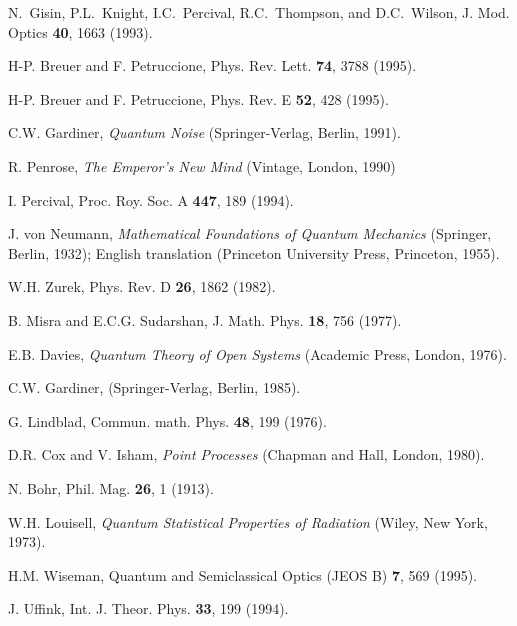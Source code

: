 \begin{thebibliography}{99}
N.~Gisin, P.L.~Knight, I.C.~Percival, R.C.~Thompson, and 
D.C.~Wilson,
J. Mod. Optics {\bf 40}, 1663 (1993).

H-P. Breuer and F. Petruccione,
Phys. Rev. Lett. {\bf 74}, 3788 (1995).

H-P. Breuer and F. Petruccione,
Phys. Rev. E {\bf 52}, 428 (1995).

C.W. Gardiner,
{\em Quantum Noise}
(Springer-Verlag, Berlin, 1991).

R. Penrose,
{\em The Emperor's New Mind}
(Vintage, London, 1990)

I. Percival,
Proc. Roy. Soc. A {\bf 447}, 189 (1994).

J. von Neumann, {\em Mathematical Foundations of Quantum Mechanics}
(Springer, Berlin, 1932);
English translation (Princeton University Press, Princeton, 1955).

W.H. Zurek,
Phys. Rev. D {\bf 26}, 1862 (1982).

B. Misra and E.C.G. Sudarshan,
J. Math. Phys. {\bf 18}, 756 (1977).

E.B. Davies,
{\em Quantum Theory of Open Systems}
(Academic Press, London, 1976).

C.W. Gardiner,
\newblock (Springer-Verlag, Berlin, 1985).

G. Lindblad,
Commun. math. Phys. {\bf 48}, 199 (1976).

D.R. Cox and V. Isham,
{\em Point Processes}
(Chapman and Hall, London, 1980).

N. Bohr, 
Phil. Mag. {\bf 26}, 1 (1913).

W.H. Louisell,
{\em Quantum Statistical Properties of Radiation}
(Wiley, New York, 1973).

H.M. Wiseman,
Quantum and Semiclassical Optics (JEOS B) {\bf 7}, 569 (1995).

J. Uffink,
Int. J. Theor. Phys. {\bf 33}, 199 (1994).


\end{thebibliography}
